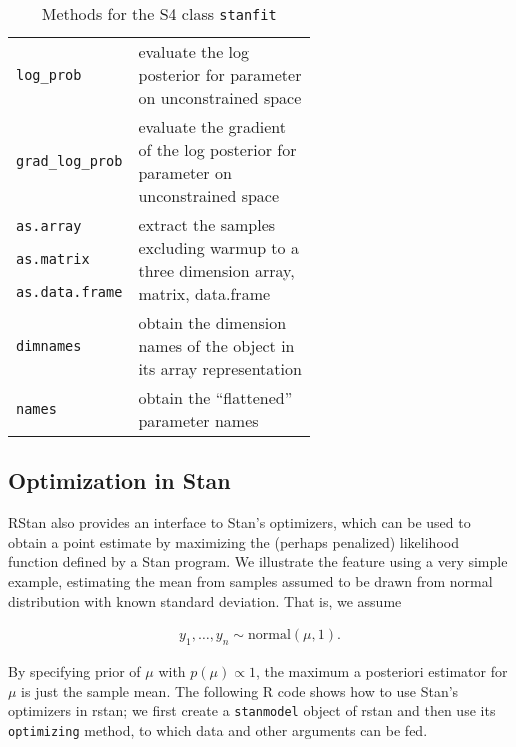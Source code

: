 \documentclass[12pt]{article}
\newcommand{\R}{R\xspace}
\newcommand{\Stan}{Stan\xspace}
\newcommand{\RStan}{RStan\xspace}
\newcommand{\code}[1]{{\tt #1}}
\newcommand{\strong}[1]{\texorpdfstring%
          {{\normalfont\fontseries{b}\selectfont #1}}%
            {#1}}
\let\pkg=\strong
\begin{document}
\begin{table}
\begin{tabular}{lp{0.6\linewidth}}
                \code{log\_prob}    & evaluate the log posterior for parameter on unconstrained space \\
                \code{grad\_log\_prob}    & evaluate the gradient of the log posterior for parameter on unconstrained space \\
                \code{as.array}        & \multirow{3}{\linewidth}{extract the samples excluding warmup to a three dimension array, matrix, data.frame}  \\
                \code{as.matrix}       & \\
                \code{as.data.frame}   & \\
                \code{dimnames}        & obtain the dimension names of the object in its array representation\\
                \code{names}           & obtain the ``flattened'' parameter names\\
                \bottomrule 
                \end{tabular}
                \caption[Methods for the S4 class stanfit]{Methods for the S4 class \code{stanfit}} 
                \label{tab0stanfitfuns} 
                \end{table}
                
                \subsection[Optimization in Stan]{Optimization in \Stan}
                \label{subsecoptimization}
                
                \RStan also provides an interface to \Stan's optimizers, which can be used
                to obtain a point estimate by maximizing the (perhaps penalized) likelihood 
                function defined by a Stan program. We illustrate the feature using a very simple
                example, estimating the mean from samples assumed to be drawn from normal 
                distribution with known standard deviation. That is, we assume 
                
                \begin{align*}
                y_1,\ldots,y_n\sim \text{normal}(\mu,1).
                \end{align*}
                
                By specifying prior of $\mu$ with $p(\mu) \propto 1$, the maximum a posteriori estimator 
                for $\mu$ is just the sample mean. The following \R code shows 
                how to use \Stan's optimizers in \pkg{rstan}; we first create a \code{stanmodel}
                object of \pkg{rstan} and then use its \code{optimizing} method, to which data 
                and other arguments can be fed.
                
\end{document}
